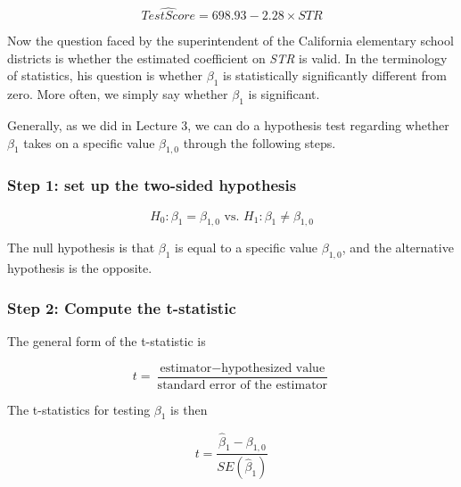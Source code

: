 \documentclass[a4paper,11pt]{article}
\begin{document}
\begin{equation}
\label{eq:testscr-str-1e}
\widehat{TestScore} = 698.93 - 2.28 \times STR
\end{equation}

Now the question faced by the superintendent of the California
elementary school districts is whether the estimated coefficient on
\emph{STR} is valid. In the terminology of statistics, his question is
whether \(\beta_1\) is statistically significantly different from
zero. More often, we simply say whether \(\beta_1\) is significant. 

Generally, as we did in Lecture 3, we can do a hypothesis test
regarding whether \(\beta_1\) takes on a specific value \(\beta_{1,0}\)
through the following steps.

\subsubsection*{Step 1: set up the two-sided hypothesis}
\label{sec:orgbf2bf2c}

\[ H_0: \beta_1 = \beta_{1,0} \text{ vs. } H_1: \beta_1 \neq \beta_{1,0} \]

The null hypothesis is that \(\beta_1\) is equal to a specific value
\(\beta_{1,0}\), and the alternative hypothesis is the opposite. 

\subsubsection*{Step 2: Compute the t-statistic}
\label{sec:org8167e92}

The general form of the t-statistic is

\begin{equation}
\label{eq:general-t}
t = \frac{\text{estimator} - \text{hypothesized value}}{\text{standard error of the estimator}}
\end{equation}

The t-statistics for testing \(\beta_1\) is then

\begin{equation}
\label{eq:t-stat-b1}
t = \frac{\hat{\beta}_1 - \beta_{1,0}}{SE(\hat{\beta}_1)}
\end{equation}
\end{document}
